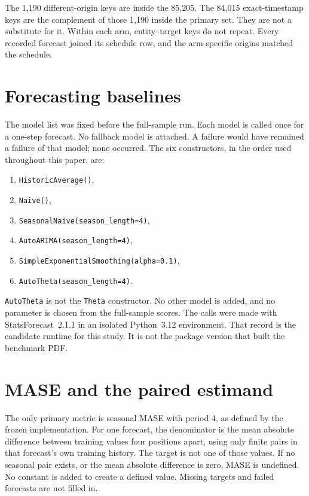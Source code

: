 \documentclass[11pt]{article}
\begin{document}
The 1{,}190 different-origin keys are inside the 85{,}205. The 84{,}015 exact-timestamp keys are the complement of those 1{,}190 inside the primary set. They are not a substitute for it. Within each arm, entity--target keys do not repeat. Every recorded forecast joined its schedule row, and the arm-specific origins matched the schedule.

\section{Forecasting baselines}
\label{sec:models}

The model list was fixed before the full-sample run. Each model is called once for a one-step forecast. No fallback model is attached. A failure would have remained a failure of that model; none occurred. The six constructors, in the order used throughout this paper, are:

\begin{enumerate}
\item \texttt{HistoricAverage()},
\item \texttt{Naive()},
\item \texttt{SeasonalNaive(season\_length=4)},
\item \texttt{AutoARIMA(season\_length=4)},
\item \texttt{SimpleExponentialSmoothing(alpha=0.1)},
\item \texttt{AutoTheta(season\_length=4)}.
\end{enumerate}

\texttt{AutoTheta} is not the \texttt{Theta} constructor. No other model is added, and no parameter is chosen from the full-sample scores. The calls were made with StatsForecast~2.1.1 \citep{nixtla2026statsforecast} in an isolated Python~3.12 environment. That record is the candidate runtime for this study. It is not the package version that built the benchmark PDF.

\section{MASE and the paired estimand}
\label{sec:estimand}

The only primary metric is seasonal MASE with period 4, as defined by the frozen implementation. For one forecast, the denominator is the mean absolute difference between training values four positions apart, using only finite pairs in that forecast's own training history. The target is not one of those values. If no seasonal pair exists, or the mean absolute difference is zero, MASE is undefined. No constant is added to create a defined value. Missing targets and failed forecasts are not filled in.
\end{document}
